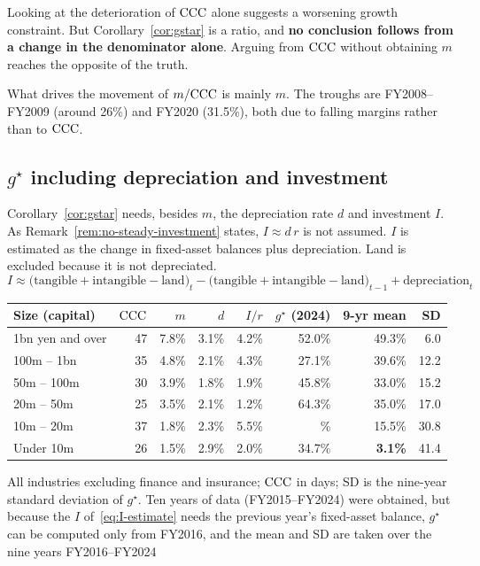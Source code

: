 \begin{remark}
Looking at the deterioration of $\mathrm{CCC}$ alone suggests a worsening growth constraint. But
Corollary~\ref{cor:gstar} is a ratio, and \textbf{no conclusion follows from a change in the
denominator alone}. Arguing from $\mathrm{CCC}$ without obtaining $m$ reaches the opposite of the
truth.

What drives the movement of $m/\mathrm{CCC}$ is mainly $m$. The troughs are FY2008--FY2009 (around
26\%) and FY2020 (31.5\%), both due to falling margins rather than to $\mathrm{CCC}$.
\end{remark}

\subsection{\texorpdfstring{$g^\star$}{g*} including depreciation and investment}

Corollary~\ref{cor:gstar} needs, besides $m$, the depreciation rate $d$ and investment $I$.
As Remark~\ref{rem:no-steady-investment} states, $I\approx d\,r$ is not assumed. $I$ is
estimated as the change in fixed-asset balances plus depreciation. Land is excluded because
it is not depreciated.
\begin{equation}
I \approx \bigl(\text{tangible}+\text{intangible}-\text{land}\bigr)_t
 - \bigl(\text{tangible}+\text{intangible}-\text{land}\bigr)_{t-1} + \text{depreciation}_t
\label{eq:I-estimate}
\end{equation}

\begin{center}
\begin{tabular}{@{}lrrrrrrr@{}}
\toprule
Size (capital) & $\mathrm{CCC}$ & $m$ & $d$ & $I/r$ & $g^\star$ (2024) & 9-yr mean & SD \\
\midrule
1bn yen and over & 47 & 7.8\% & 3.1\% & 4.2\% & 52.0\% & 49.3\% & 6.0 \\
100m -- 1bn & 35 & 4.8\% & 2.1\% & 4.3\% & 27.1\% & 39.6\% & 12.2 \\
50m -- 100m & 30 & 3.9\% & 1.8\% & 1.9\% & 45.8\% & 33.0\% & 15.2 \\
20m -- 50m & 25 & 3.5\% & 2.1\% & 1.2\% & 64.3\% & 35.0\% & 17.0 \\
10m -- 20m & 37 & 1.8\% & 2.3\% & 5.5\% & \textminus 13.8\% & 15.5\% & 30.8 \\
Under 10m & 26 & 1.5\% & 2.9\% & 2.0\% & 34.7\% & \textbf{3.1\%} & 41.4 \\
\bottomrule
\end{tabular}
\label{tab:gstar-by-size}
\end{center}
\begin{center}\footnotesize All industries excluding finance and insurance; $\mathrm{CCC}$ in days; SD is the nine-year standard deviation of $g^\star$.
Ten years of data (FY2015--FY2024) were obtained, but because the $I$ of~\eqref{eq:I-estimate} needs the previous year's fixed-asset balance, $g^\star$ can be computed only from FY2016, and the mean and SD are taken over the nine years FY2016--FY2024\end{center}


